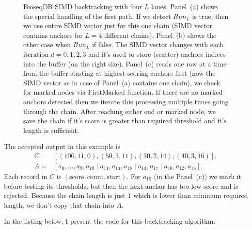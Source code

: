 \begin{figure}[H]
\caption{BioseqDB SIMD backtracking with four $L$ lanes. Panel~(a) shows the special handling of the
first path. If we detect $Run_L$ is true, then we use entire SIMD vector just for this one chain (SIMD vector contains anchors for $L=4$ different chains).  Panel~(b) shows the other case when $Run_L$ if false. The SIMD vector changes with each iteration $d=0,1,2,3$ and it's used to store (scatter) anchors indices into the buffer (on the right size).
Panel~(c) reads one row at a time from the buffer starting at highest-scoring anchors first (now the SIMD vector as in case of Panel~(a) contains one chain), we check for marked nodes via $\text{FirstMarked}$ function. If there are no marked anchors detected then we iterate this processing multiple times going through the chain. After reaching either end or marked node, we save the chain if it's score is greater than required threshold and it's length is sufficient.}
\label{fig:chaining-simd-backtracking}
\end{figure}

The accepted output in this example is
\[
\begin{aligned}
 C={}&[(100,11,0),(50,3,11),(30,2,14),(40,3,16)],\\
 A={}&[a_0,\ldots,a_9,a_{19}\mid a_{11},a_{14},a_{18}
       \mid a_{13},a_{17}\mid a_{10},a_{12},a_{16}].
\end{aligned}
\]
Each record in \(C\) is \((\text{score},\text{count},\text{start})\).
For \(a_{15}\) (in the Panel~(c)) we mark it before testing its thresholds, but then the next anchor has too low score and is rejected. Because the chain length is just $1$ which is lower than minimum required length, we don't copy that chain into \(A\).

In the listing below, I present the code for this backtracking algorithm.

